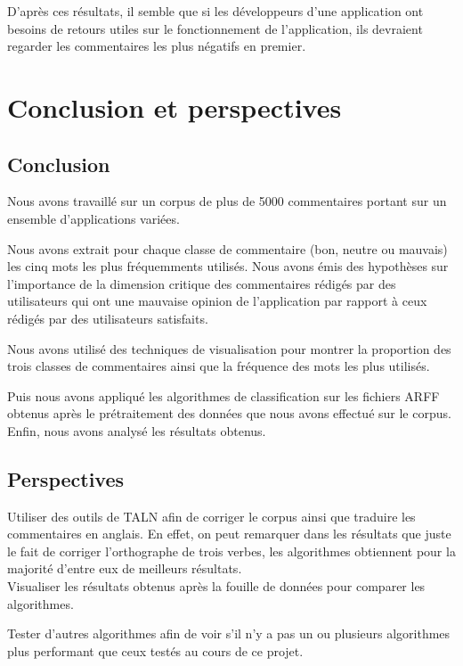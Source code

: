 \documentclass[a4paper, 11pt]{article}
\begin{document}
D'après ces résultats, il semble que si les développeurs d'une application ont besoins de retours utiles sur le fonctionnement de l'application, ils devraient regarder les commentaires les plus négatifs en premier.

\section{Conclusion et perspectives}
\subsection{Conclusion}
Nous avons travaillé sur un corpus de plus de 5000 commentaires portant sur un ensemble d'applications variées. 

Nous avons extrait pour chaque classe de commentaire (bon, neutre ou mauvais) les cinq mots les plus fréquemments utilisés. Nous avons émis des hypothèses sur l'importance de la dimension critique des commentaires rédigés par des utilisateurs qui ont une mauvaise opinion de l'application par rapport à ceux rédigés par des utilisateurs satisfaits.

Nous avons utilisé des techniques de visualisation pour montrer la proportion des trois classes de commentaires ainsi que la fréquence des mots les plus utilisés.

Puis nous avons appliqué les algorithmes de classification sur les fichiers ARFF obtenus après le prétraitement des données que nous avons effectué sur le corpus. Enfin, nous avons analysé les résultats obtenus.

\subsection{Perspectives}
Utiliser des outils de TALN afin de corriger le corpus ainsi que traduire les commentaires en anglais. En effet, on peut remarquer dans les résultats que juste le fait de corriger l'orthographe de trois verbes, les algorithmes obtiennent pour la majorité d'entre eux de meilleurs résultats.\\

Visualiser les résultats obtenus après la fouille de données pour comparer les algorithmes.

Tester d'autres algorithmes afin de voir s'il n'y a pas un ou plusieurs algorithmes plus performant que ceux testés au cours de ce projet.
\end{document}
